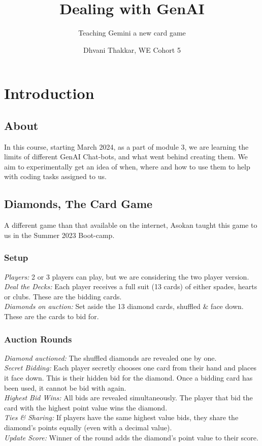 \documentclass[runningheads]{llncs}
\begin{document}
%
\title{Dealing with GenAI}
%
\subtitle{Teaching Gemini a new card game}
%
\author{Dhvani Thakkar, WE Cohort 5}
%
\maketitle              %
%
\section{Introduction}
\subsection{About}
In this course, starting March 2024, as a part of module 3, we are learning the limits of different GenAI Chat-bots, and what went behind creating them. We aim to experimentally get an idea of when, where and how to use them to help with coding tasks assigned to us. 

\subsection{Diamonds, The Card Game}
A different game than that available on the internet, Asokan taught this game to us in the Summer 2023 Boot-camp.

\subsubsection{Setup}
\hfill \break
\textit{Players:}
2 or 3 players can play, but we are considering the two player version.\\
\textit{Deal the Decks:}
Each player receives a full suit (13 cards) of either spades, hearts or clubs. These are the bidding cards.\\
\textit{Diamonds on auction:}
 Set aside the 13 diamond cards, shuffled \& face down. These are the cards to bid for.
 
\subsubsection{Auction Rounds}
\hfill \break
\textit{Diamond auctioned:}
 The shuffled diamonds are revealed one by one.\\
\textit{Secret Bidding:}
 Each player secretly chooses one card from their hand and places it face down. This is their hidden bid for the diamond. Once a bidding card has been used, it cannot be bid with again.\\
\textit{Highest Bid Wins:}
 All bids are revealed simultaneously. The player that bid the card with the highest point value wins the diamond.\\
\textit{Ties \& Sharing:}
 If players have the same highest value bids, they share the diamond's points equally (even with a decimal value).\\
\textit{Update Score:}
Winner of the round adds the diamond's point value to their score. \\
\end{document}
